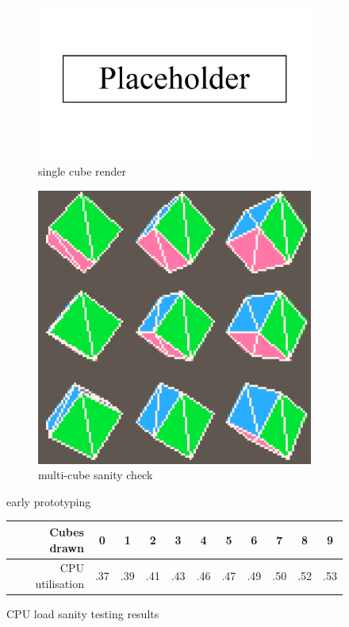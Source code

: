 \documentclass{article}
\begin{document}

\begin{figure}[h]
\begin{subfigure}{.5\textwidth}
  \centering
  \includegraphics[width=.8\linewidth]{placeholder}
  \caption{single cube render}
  \label{fig:3dfig1}
\end{subfigure}
\begin{subfigure}{.5\textwidth}
  \centering
  \includegraphics[width=.8\linewidth]{test3d}
  \caption{multi-cube sanity check}
  \label{fig:3dfig2}
\end{subfigure}
\caption{early prototyping}
\label{fig:3dprototype}
\end{figure}

\begin{figure}[h]
\begin{center}
\begin{tabular}{r|c c c c c c c c c c}
     Cubes drawn & 0 & 1 & 2 & 3 & 4 & 5 & 6 & 7 & 8 & 9 \\
     \hline
     CPU utilisation & .37 & .39 & .41 & .43 & .46 & .47 & .49 & .50 & .52 & .53
\end{tabular}
\end{center}
\caption{CPU load sanity testing results}
\label{fig:3dtest}
\end{figure}
\end{document}
